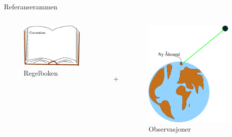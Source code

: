 \documentclass[12pt,table,t]{beamer}
\begin{document}
\begin{frame}{Referanserammen}
  \begin{columns}
      \vspace{0.9cm}
      \begin{figure}
        \includegraphics[width=0.95\textwidth]{figure/book.eps}\caption{Regelboken}
      \end{figure}
    \\ \ \\ \ \\ \ \\ \ \\ 
      +  
      \begin{figure}
        \includegraphics[width=0.95\textwidth]{figure/jordklode.eps}\caption{Observasjoner}

\end{figure}
\end{columns}
\end{frame}
\end{document}
